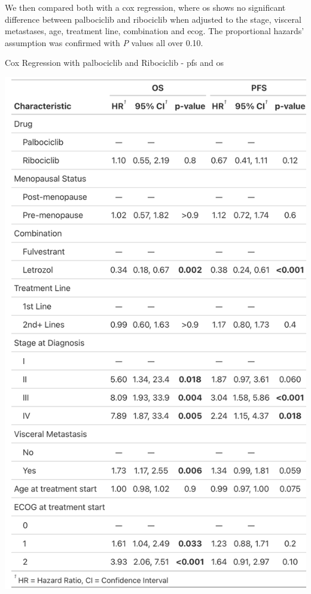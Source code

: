We then compared both with a cox regression, where \ac{os} shows no significant difference between palbociclib and ribociclib when adjusted to the stage, visceral metastases, age, treatment line, combination and \ac{ecog}. The proportional hazards' assumption was confirmed with \textit{P} values all over 0.10.
\begin{table}[ht]
  \centering
  \caption[Cox Regression with palbociclib and Ribociclib - \acs{pfs} and \acs{os}]{Cox Regression with palbociclib and Ribociclib - \ac{pfs} and \ac{os}}\label{tab:cox} 
  \includegraphics[scale=0.20]{figures/cox_both.png}%

\end{table}

